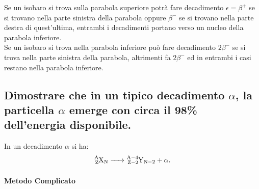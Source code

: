 Se un isobaro si trova sulla parabola superiore potrà fare decadimento $\epsilon= \beta^{+}$ se si trovano nella parte sinistra della parabola oppure $\beta^{-}$ se si trovano nella parte destra di quest'ultima, entrambi i decadimenti portano verso un nucleo della parabola inferiore. \\
Se un isobaro si trova nella parabola inferiore può fare decadimento $2\beta^{-}$ se si trova nella parte sinistra della parabola, altrimenti fa $2\beta^{-}$ ed in entrambi i casi restano nella parabola inferiore.

\subsection[\hspace{2mm} Considerazioni energetiche sul decadimento $\alpha$]{Dimostrare che in un tipico decadimento $\alpha$, la particella $\alpha$ emerge con circa il 98\% dell'energia disponibile.}
In un decadimento $\alpha$ si ha:
\[
\ce{\ce{^{A}_{Z}X_{N}} -> \ce{^{A-4}_{Z-2}Y_{N-2}} + \alpha}
.\]
\paragraph{Metodo Complicato}%

